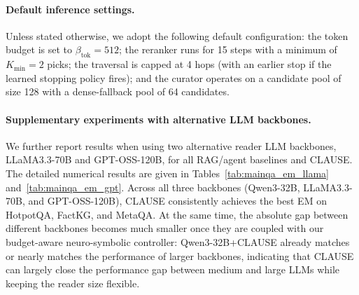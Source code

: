 \documentclass{article} %
\newcommand{\method}{\textsc{CLAUSE}\xspace}
\begin{document}



\paragraph{Default inference settings.}
Unless stated otherwise, we adopt the following default configuration: the token budget is set to $\beta_{\text{tok}} = 512$; the reranker runs for 15 steps with a minimum of $K_{\min}=2$ picks; the traversal is capped at 4 hops (with an earlier stop if the learned stopping policy fires); and the curator operates on a candidate pool of size 128 with a dense-fallback pool of 64 candidates.


\paragraph{Supplementary experiments with alternative LLM backbones.}
We further report results when using two alternative reader LLM backbones, LLaMA3.3-70B and GPT-OSS-120B, for all RAG/agent baselines and \method{}. The detailed numerical results are given in Tables~\ref{tab:mainqa_em_llama} and~\ref{tab:mainqa_em_gpt}. Across all three backbones (Qwen3-32B, LLaMA3.3-70B, and GPT-OSS-120B), \method{} consistently achieves the best EM on HotpotQA, FactKG, and MetaQA. At the same time, the absolute gap between different backbones becomes much smaller once they are coupled with our budget-aware neuro-symbolic controller: Qwen3-32B+\method{} already matches or nearly matches the performance of larger backbones, indicating that \method{} can largely close the performance gap between medium and large LLMs while keeping the reader size flexible.
\end{document}
